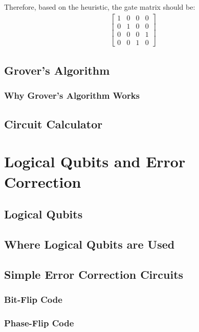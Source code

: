 \documentclass{article}
\begin{document}
Therefore, based on the heuristic, the gate matrix should be:
\begin{align*}
	\begin{bmatrix}
		1 & 0 & 0 & 0 \\
		0 & 1 & 0 & 0 \\
		0 & 0 & 0 & 1 \\
		0 & 0 & 1 & 0
	\end{bmatrix}
\end{align*}

\subsection{Grover's Algorithm}
\label{sec:groversalgorithm}
\subsubsection{Why Grover's Algorithm Works}
\label{sec:whygroverworks}
\subsection{Circuit Calculator}
\label{sec:circuitcalculator}







\section{Logical Qubits and Error Correction}
\label{sec:errorcorrection}

\subsection{Logical Qubits}
\label{sec:logicalqubits}
\subsection{Where Logical Qubits are Used}
\label{sec:wherelqused}
\subsection{Simple Error Correction Circuits}
\label{sec:simpleeccircuits}
\subsubsection{Bit-Flip Code}
\label{sec:bitflipcode}
\subsubsection{Phase-Flip Code}
\label{sec:phaseflipcode}
\end{document}
